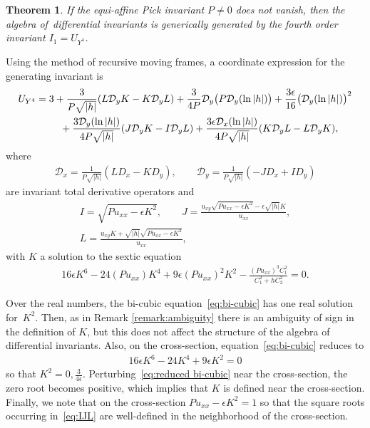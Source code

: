 \documentclass[pdftex]{sigma}%
\numberwithin{equation}{section}
\newtheorem{Theorem}{Theorem}[section]
\newcommand{\D}{\mathcal{D}}
\begin{document}
\begin{Theorem}
If the equi-affine Pick invariant $P\neq0$ does not vanish, then the algebra of~dif\-ferential invariants is generically generated by the fourth order invariant $I_1=U_{Y^4}$.
\end{Theorem}

Using the method of recursive moving frames, a coordinate expression for the generating invariant is
\begin{gather*}
U_{Y^4} = 3 + \frac{3}{P\sqrt{|h|}}(L \D_y K - K \D_yL) +\frac{3}{4P}\D_y\big(P \D_y(\ln|h|)\big)+ \frac{3\epsilon}{16}\big(\D_y(\ln|h|)\big)^2
\\ \hphantom{U_{Y^4} =}
{}+\frac{3\D_y(\ln|h|)}{4P\sqrt{|h|}}(J \D_y K-I \D_y L) + \frac{3\epsilon\D_x(\ln|h|)}{4P\sqrt{|h|}}(K \D_y L - L \D_yK),
\end{gather*}
%
where
\begin{gather*}
\D_x = \frac{1}{P\sqrt{|h|}}(L D_x - K D_y),\qquad
\D_y = \frac{1}{P\sqrt{|h|}}(-J D_x + I D_y)
\end{gather*}
are invariant total derivative operators and
\begin{gather}
I = \sqrt{Pu_{xx}-\epsilon K^2},\qquad
J = \frac{u_{xy}\sqrt{Pu_{xx}-\epsilon K^2}-\epsilon \sqrt{|h|} K}{u_{xx}},\nonumber
\\
L = \frac{u_{xy}K+\sqrt{|h|}\sqrt{Pu_{xx}-\epsilon K^2}}{u_{xx}},
\label{eq:IJL}
\end{gather}
%
with $K$ a solution to the sextic equation
%
\begin{gather}\label{eq:bi-cubic}
16\epsilon K^6 - 24 (Pu_{xx})K^4+ 9\epsilon (Pu_{xx})^2 K^2 - \frac{(Pu_{xx})^3 C_1^2}{C_1^2+hC_2^2} =0.
\end{gather}

\begin{Remark}
Over the real numbers, the bi-cubic equation~\eqref{eq:bi-cubic} has one real solution for~$K^2$. Then, as in Remark \ref{remark:ambiguity} there is an ambiguity of sign in the definition of $K$, but this does not affect the structure of the algebra of differential invariants. Also, on the cross-section, equation~\eqref{eq:bi-cubic} reduces to
%
\begin{gather}\label{eq:reduced bi-cubic}
16\epsilon K^6-24K^4+9\epsilon K^2 = 0
\end{gather}
%
so that $K^2=0,\frac{3}{4\epsilon}$. Perturbing~\eqref{eq:reduced bi-cubic} near the cross-section, the zero root becomes positive, which implies that $K$ is defined near the cross-section. Finally, we note that on the cross-section $Pu_{xx}-\epsilon K^2 = 1$ so that the square roots occurring in~\eqref{eq:IJL} are well-defined in the neighborhood of the cross-section.
\end{Remark}
\end{document}

